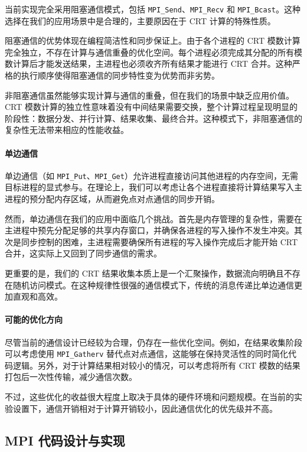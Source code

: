 \documentclass[a4paper]{article}
\begin{document}
当前实现完全采用阻塞通信模式，包括 \texttt{MPI\_Send}、\texttt{MPI\_Recv} 和 \texttt{MPI\_Bcast}。这种选择在我们的应用场景中是合理的，主要原因在于 CRT 计算的特殊性质。

阻塞通信的优势体现在编程简洁性和同步保证上。由于各个进程的 CRT 模数计算完全独立，不存在计算与通信重叠的优化空间。每个进程必须完成其分配的所有模数计算后才能发送结果，主进程也必须收齐所有结果才能进行 CRT 合并。这种严格的执行顺序使得阻塞通信的同步特性变为优势而非劣势。

非阻塞通信虽然能够实现计算与通信的重叠，但在我们的场景中缺乏应用价值。CRT 模数计算的独立性意味着没有中间结果需要交换，整个计算过程呈现明显的阶段性：数据分发、并行计算、结果收集、最终合并。这种模式下，非阻塞通信的复杂性无法带来相应的性能收益。

\paragraph{单边通信}

单边通信（如 \texttt{MPI\_Put}、\texttt{MPI\_Get}）允许进程直接访问其他进程的内存空间，无需目标进程的显式参与。在理论上，我们可以考虑让各个进程直接将计算结果写入主进程的预分配内存区域，从而避免点对点通信的同步开销。

然而，单边通信在我们的应用中面临几个挑战。首先是内存管理的复杂性，需要在主进程中预先分配足够的共享内存窗口，并确保各进程的写入操作不发生冲突。其次是同步控制的困难，主进程需要确保所有进程的写入操作完成后才能开始 CRT 合并，这实际上又回到了同步通信的需求。

更重要的是，我们的 CRT 结果收集本质上是一个汇聚操作，数据流向明确且不存在随机访问模式。在这种规律性很强的通信模式下，传统的消息传递比单边通信更加直观和高效。

\paragraph{可能的优化方向}

尽管当前的通信设计已经较为合理，仍存在一些优化空间。例如，在结果收集阶段可以考虑使用 \texttt{MPI\_Gatherv} 替代点对点通信，这能够在保持灵活性的同时简化代码逻辑。另外，对于计算结果相对较小的情况，可以考虑将所有 CRT 模数的结果打包后一次性传输，减少通信次数。

不过，这些优化的收益很大程度上取决于具体的硬件环境和问题规模。在当前的实验设置下，通信开销相对于计算开销较小，因此通信优化的优先级并不高。

\subsection{MPI 代码设计与实现}
\end{document}
